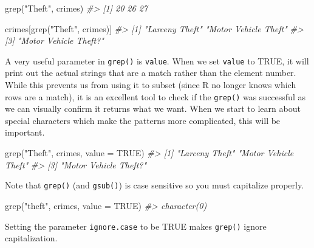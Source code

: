 \documentclass[
]{krantz}
\makeatletter
\newenvironment{Shaded}{\begin{snugshade}}{\end{snugshade}}
\newcommand{\AttributeTok}[1]{\textcolor[rgb]{0.61,0.61,0.61}{#1}}
\newcommand{\CommentTok}[1]{\textcolor[rgb]{0.37,0.37,0.37}{\textit{#1}}}
\newcommand{\ConstantTok}[1]{\textcolor[rgb]{0,0,0}{#1}}
\newcommand{\FunctionTok}[1]{\textcolor[rgb]{0,0,0}{#1}}
\newcommand{\NormalTok}[1]{#1}
\newcommand{\StringTok}[1]{\textcolor[rgb]{0.5,0.5,0.5}{#1}}
\newenvironment{kframe}{%
\medskip{}
\setlength{\fboxsep}{.8em}
 \def\at@end@of@kframe{}%
 \ifinner\ifhmode%
  \def\at@end@of@kframe{\end{minipage}}%
  \begin{minipage}{\columnwidth}%
 \fi\fi%
 \def\FrameCommand##1{\hskip\@totalleftmargin \hskip-\fboxsep
 \colorbox{shadecolor}{##1}\hskip-\fboxsep
     \hskip-\linewidth \hskip-\@totalleftmargin \hskip\columnwidth}%
 \MakeFramed {\advance\hsize-\width
   \@totalleftmargin\z@ \linewidth\hsize
   \@setminipage}}%
 {\par\unskip\endMakeFramed%
 \at@end@of@kframe}
\renewenvironment{Shaded}{\begin{kframe}}{\end{kframe}}
\makeatother
\begin{document}
\begin{Shaded}
\begin{Highlighting}[]
\FunctionTok{grep}\NormalTok{(}\StringTok{"Theft"}\NormalTok{, crimes)}
\CommentTok{\#\textgreater{} [1] 20 26 27}
\end{Highlighting}
\end{Shaded}

\begin{Shaded}
\begin{Highlighting}[]
\NormalTok{crimes[}\FunctionTok{grep}\NormalTok{(}\StringTok{"Theft"}\NormalTok{, crimes)]}
\CommentTok{\#\textgreater{} [1] "Larceny Theft"        "Motor Vehicle Theft" }
\CommentTok{\#\textgreater{} [3] "Motor Vehicle Theft?"}
\end{Highlighting}
\end{Shaded}

A very useful parameter in \texttt{grep()} is
\texttt{value}. When we set \texttt{value} to TRUE, it will
print out the actual strings that are a match rather than
the element number. While this prevents us from using it to
subset (since R no longer knows which rows are a match), it
is an excellent tool to check if the \texttt{grep()} was
successful as we can visually confirm it returns what we
want. When we start to learn about special characters which
make the patterns more complicated, this will be important.

\begin{Shaded}
\begin{Highlighting}[]
\FunctionTok{grep}\NormalTok{(}\StringTok{"Theft"}\NormalTok{, crimes, }\AttributeTok{value =} \ConstantTok{TRUE}\NormalTok{)}
\CommentTok{\#\textgreater{} [1] "Larceny Theft"        "Motor Vehicle Theft" }
\CommentTok{\#\textgreater{} [3] "Motor Vehicle Theft?"}
\end{Highlighting}
\end{Shaded}

Note that \texttt{grep()} (and \texttt{gsub()}) is case
sensitive so you must capitalize properly.

\begin{Shaded}
\begin{Highlighting}[]
\FunctionTok{grep}\NormalTok{(}\StringTok{"theft"}\NormalTok{, crimes, }\AttributeTok{value =} \ConstantTok{TRUE}\NormalTok{)}
\CommentTok{\#\textgreater{} character(0)}
\end{Highlighting}
\end{Shaded}

Setting the parameter \texttt{ignore.case} to be TRUE makes
\texttt{grep()} ignore capitalization.
\end{document}
